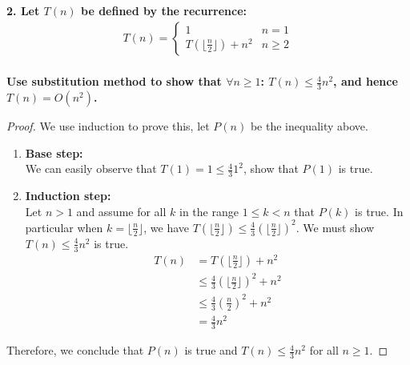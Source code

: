 \documentclass[12pt]{article}
\begin{document}
\noindent \textbf{2. Let $T(n)$ be defined by the recurrence:
	\begin{align*}
			T(n)=\begin{cases}
			1 &n=1\\
			T(\lfloor\frac{n}{2}\rfloor)+n^2 &n\ge2
			\end{cases}
	\end{align*}\\
Use substitution method to show that $\forall n\ge1$: $T(n)\le\frac{4}{3}n^2$, and hence $T(n)=O(n^2)$.
}
\begin{proof}
	We use induction to prove this, let $P(n)$ be the inequality above.
	\begin{enumerate}
		\item \textbf{Base step:}\\
		We can easily observe that $T(1)=1\le\frac{4}{3}1^2$, show that $P(1)$ is true.
		\item \textbf{Induction step:}\\
		Let $n>1$ and assume for all $k$ in the range $1\le k<n$ that $P(k)$ is true. In particular when $k=\lfloor \frac{n}{2}\rfloor$, we have $T(\lfloor \frac{n}{2}\rfloor)\le \frac{4}{3}(\lfloor \frac{n}{2}\rfloor)^2$. We must show $T(n)\le \frac{4}{3}n^2$ is true.
		\begin{align*}
			T(n)&=T(\lfloor\frac{n}{2}\rfloor)+n^2\\
			&\le\frac{4}{3}(\lfloor \frac{n}{2}\rfloor)^2+n^2\\
			&\le\frac{4}{3}(\frac{n}{2})^2+n^2\\
			&=\frac{4}{3}n^2
		\end{align*}
	\end{enumerate}
Therefore, we conclude that $P(n)$ is true and $T(n)\le\frac{4}{3}n^2$ for all $n\ge1$.
\end{proof}
\end{document}
